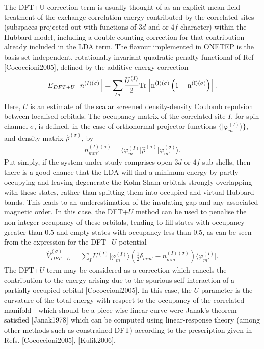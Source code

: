 \documentclass[letterpaper,10pt,english]{sphinxmanual}
\begin{document}
The DFT+U correction term is usually thought of as an explicit
mean-field treatment of the exchange-correlation energy contributed by
the correlated sites (subspaces projected out with functions of
\(3d\) and or \(4f\) character) within the Hubbard model,
including a double-counting correction for that contribution already
included in the LDA term. The flavour implemented in ONETEP is the
basis-set independent, rotationally invariant quadratic penalty
functional of Ref {[}Cococcioni2005{]}, defined by the
additive energy correction
\begin{equation*}
\begin{split}E_{DFT+U} \left[ n^{(I) (\sigma)} \right] =  \sum_{I \sigma} \frac{U^{(I)}}{2} \rm{Tr}
\left[  n^{(I) (\sigma)} \left( 1 -  n^{(I) (\sigma)} \right)\right].\end{split}
\end{equation*}
Here, \(U\) is an estimate of the scalar screened density-density
Coulomb repulsion between localised orbitals. The occupancy matrix of
the correlated site \(I\), for spin channel \(\sigma\), is
defined, in the case of orthonormal projector functions \(\lbrace \lvert \varphi^{(I)}_m \rangle \rbrace\), and density-matrix
\(\hat{\rho}^{(\sigma)}\), by
\begin{equation*}
\begin{split}n^{(I)(\sigma)}_{m m'} = \langle \varphi_m^{(I)} \rvert \hat{\rho}^{(\sigma)}
\lvert \varphi_{m'}^{(\sigma)} \rangle.\end{split}
\end{equation*}
Put simply, if the system under study comprises open \(3d\) or
\(4f\) sub-shells, then there is a good chance that the LDA will
find a minimum energy by partly occupying and leaving degenerate the
Kohn-Sham orbitals strongly overlapping with these states, rather than
splitting them into occupied and virtual Hubbard bands. This leads to an
underestimation of the insulating gap and any associated magnetic order.
In this case, the DFT+\(U\) method can be used to penalise the
non-integer occupancy of these orbitals, tending to fill states with
occupancy greater than \(0.5\) and empty states with occupancy less
than \(0.5\), as can be seen from the expression for the
DFT+\(U\) potential
\begin{equation*}
\begin{split}\hat{V}^{(\sigma)}_{DFT+U} = \sum_{I}  U^{(I)}
 \lvert \varphi_m^{(I)} \rangle
\left( \frac{1}{2} \delta_{m m'} - n^{(I) (\sigma)}_{m m'} \right)  \langle
\varphi_{m'}^{(I)} \rvert .\end{split}
\end{equation*}
The DFT+\(U\) term may be considered as a correction which cancels
the contribution to the energy arising due to the spurious
self-interaction of a partially occupied
orbital {[}Cococcioni2005{]}. In this case, the \(U\)
parameter is the curvature of the total energy with respect to the
occupancy of the correlated manifold - which should be a piece-wise
linear curve were Janak’s theorem satisfied {[}Janak1978{]} \textendash{}
which can be computed using linear-response theory (among other methods
such as constrained DFT) according to the prescription given in
Refs. {[}Cococcioni2005{]}, {[}Kulik2006{]}.
\end{document}
